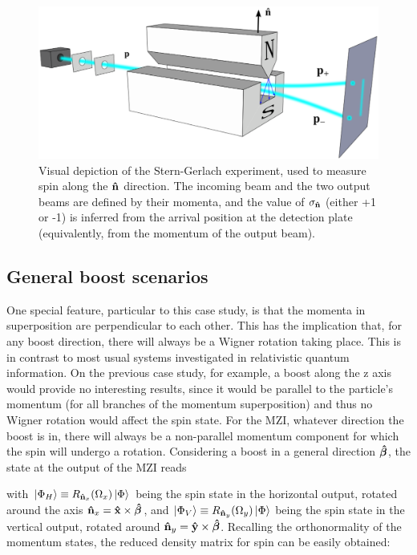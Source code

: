 \documentclass[12pt,a4paper,notitlepage]{report}
\begin{document}
\begin{figure}[t]
  \centering
  \includegraphics[width=.8\textwidth]{../Figuras/SG_f.eps}
  \captionsetup{font=footnotesize, margin=8pt}
  \caption{Visual depiction of the Stern-Gerlach experiment, used to measure spin along the $\vu{n}$ direction. The incoming beam and the two output beams are defined by their momenta, and the value of $\sigma_{\vu{n}}$ (either +1 or -1) is inferred from the arrival position at the detection plate (equivalently, from the momentum of the output beam).}
  \label{sg-fig}
\end{figure}

\subsection{General boost scenarios}

One special feature, particular to this case study, is that the momenta in superposition are perpendicular to each other. This has the implication that, for any boost direction, there will always be a Wigner rotation taking place. This is in contrast to most usual systems investigated in relativistic quantum information. On the previous case study, for example, a boost along the z axis would provide no interesting results, since it would be parallel to the particle's momentum (for all branches of the momentum superposition) and thus no Wigner rotation would affect the spin state. For the MZI, whatever direction the boost is in, there will always be a non-parallel momentum component for which the spin will undergo a rotation. Considering a boost in a general direction $\vu*{\beta}$, the state at the output of the MZI reads

%
with $\ket{\Phi_H} \equiv R_{\vu{n}_x}(\Omega_x) \ket{\Phi}$ being the spin state in the horizontal output, rotated around the axis $\vu{n}_x = \vu{x}\times\vu*{\beta}$, and $\ket{\Phi_V} \equiv R_{\vu{n}_y}(\Omega_y) \ket{\Phi}$ being the spin state in the vertical output, rotated around $\vu{n}_y = \vu{y}\times\vu*{\beta}$. Recalling the orthonormality of the momentum states, the reduced density matrix for spin can be easily obtained:
\end{document}
